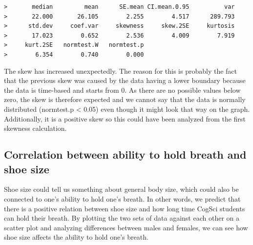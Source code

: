 \documentclass[]{article}
\newenvironment{Shaded}{\begin{snugshade}}{\end{snugshade}}
\newcommand{\DataTypeTok}[1]{\textcolor[rgb]{0.13,0.29,0.53}{#1}}
\newcommand{\DecValTok}[1]{\textcolor[rgb]{0.00,0.00,0.81}{#1}}
\newcommand{\KeywordTok}[1]{\textcolor[rgb]{0.13,0.29,0.53}{\textbf{#1}}}
\newcommand{\NormalTok}[1]{#1}
\newcommand{\OperatorTok}[1]{\textcolor[rgb]{0.81,0.36,0.00}{\textbf{#1}}}
\begin{document}
\begin{Shaded}
\end{Shaded}

\begin{verbatim}
>       median         mean      SE.mean CI.mean.0.95          var 
>       22.000       26.105        2.255        4.517      289.793 
>      std.dev     coef.var     skewness     skew.2SE     kurtosis 
>       17.023        0.652        2.536        4.009        7.919 
>     kurt.2SE   normtest.W   normtest.p 
>        6.354        0.740        0.000
\end{verbatim}

The skew has increased unexpectedly. The reason for this is probably the fact that the previous skew was caused by the data having a lower boundary because the data is time-based and starts from 0. As there are no possible values below zero, the skew is therefore expected and we cannot say that the data is normally distributed (normtest.p \textless{} 0.05) even though it might look that way on the graph. Additionally, it is a positive skew so this could have been analyzed from the first skewness calculation.

\hypertarget{correlation-between-ability-to-hold-breath-and-shoe-size}{%
\subsection{Correlation between ability to hold breath and shoe size}\label{correlation-between-ability-to-hold-breath-and-shoe-size}}

Shoe size could tell us something about general body size, which could also be connected to one's ability to hold one's breath. In other words, we predict that there is a positive relation between shoe size and how long time CogSci students can hold their breath.
By plotting the two sets of data against each other on a scatter plot and analyzing differences between males and females, we can see how shoe size affects the ability to hold one's breath.
\end{document}
